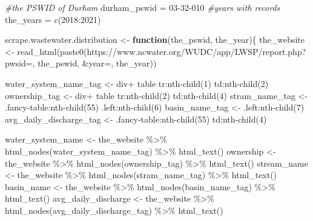 \documentclass[
  12pt,
]{article}
\newenvironment{Shaded}{\begin{snugshade}}{\end{snugshade}}
\newcommand{\CommentTok}[1]{\textcolor[rgb]{0.56,0.35,0.01}{\textit{#1}}}
\newcommand{\ControlFlowTok}[1]{\textcolor[rgb]{0.13,0.29,0.53}{\textbf{#1}}}
\newcommand{\DecValTok}[1]{\textcolor[rgb]{0.00,0.00,0.81}{#1}}
\newcommand{\FunctionTok}[1]{\textcolor[rgb]{0.00,0.00,0.00}{#1}}
\newcommand{\NormalTok}[1]{#1}
\newcommand{\OtherTok}[1]{\textcolor[rgb]{0.56,0.35,0.01}{#1}}
\newcommand{\SpecialCharTok}[1]{\textcolor[rgb]{0.00,0.00,0.00}{#1}}
\newcommand{\StringTok}[1]{\textcolor[rgb]{0.31,0.60,0.02}{#1}}
\begin{document}
\begin{Shaded}
\begin{Highlighting}[]
\CommentTok{\#the PSWID of Durham}
\NormalTok{durham\_pswid }\OtherTok{=} \StringTok{\textquotesingle{}03{-}32{-}010\textquotesingle{}}
\CommentTok{\#years with records}
\NormalTok{the\_years }\OtherTok{=} \FunctionTok{c}\NormalTok{(}\DecValTok{2018}\SpecialCharTok{:}\DecValTok{2021}\NormalTok{)}

\NormalTok{scrape.wastewater.distribution }\OtherTok{\textless{}{-}} \ControlFlowTok{function}\NormalTok{(the\_pswid, the\_year)\{}
\NormalTok{  the\_website }\OtherTok{\textless{}{-}} \FunctionTok{read\_html}\NormalTok{(}\FunctionTok{paste0}\NormalTok{(}\StringTok{\textquotesingle{}https://www.ncwater.org/WUDC/app/LWSP/report.php?pwsid=\textquotesingle{}}\NormalTok{, }
\NormalTok{                                  the\_pswid, }\StringTok{\textquotesingle{}\&year=\textquotesingle{}}\NormalTok{, the\_year))}
  
\NormalTok{  water\_system\_name\_tag }\OtherTok{\textless{}{-}} \StringTok{\textquotesingle{}div+ table tr:nth{-}child(1) td:nth{-}child(2)\textquotesingle{}}
\NormalTok{  ownership\_tag }\OtherTok{\textless{}{-}} \StringTok{\textquotesingle{}div+ table tr:nth{-}child(2) td:nth{-}child(4)\textquotesingle{}}
\NormalTok{  stram\_name\_tag }\OtherTok{\textless{}{-}} \StringTok{\textquotesingle{}.fancy{-}table:nth{-}child(55) .left:nth{-}child(6)\textquotesingle{}}
\NormalTok{  basin\_name\_tag }\OtherTok{\textless{}{-}} \StringTok{\textquotesingle{}.left:nth{-}child(7)\textquotesingle{}}
\NormalTok{  avg\_daily\_discharge\_tag }\OtherTok{\textless{}{-}} \StringTok{\textquotesingle{}.fancy{-}table:nth{-}child(55) td:nth{-}child(4)\textquotesingle{}}

\NormalTok{  water\_system\_name }\OtherTok{\textless{}{-}}\NormalTok{ the\_website }\SpecialCharTok{\%\textgreater{}\%} \FunctionTok{html\_nodes}\NormalTok{(water\_system\_name\_tag) }\SpecialCharTok{\%\textgreater{}\%} \FunctionTok{html\_text}\NormalTok{()}
\NormalTok{  ownership }\OtherTok{\textless{}{-}}\NormalTok{ the\_website }\SpecialCharTok{\%\textgreater{}\%}   \FunctionTok{html\_nodes}\NormalTok{(ownership\_tag) }\SpecialCharTok{\%\textgreater{}\%}  \FunctionTok{html\_text}\NormalTok{()}
\NormalTok{  stream\_name }\OtherTok{\textless{}{-}}\NormalTok{ the\_website }\SpecialCharTok{\%\textgreater{}\%} \FunctionTok{html\_nodes}\NormalTok{(stram\_name\_tag) }\SpecialCharTok{\%\textgreater{}\%} \FunctionTok{html\_text}\NormalTok{()}
\NormalTok{  basin\_name }\OtherTok{\textless{}{-}}\NormalTok{ the\_website }\SpecialCharTok{\%\textgreater{}\%} \FunctionTok{html\_nodes}\NormalTok{(basin\_name\_tag) }\SpecialCharTok{\%\textgreater{}\%} \FunctionTok{html\_text}\NormalTok{()}
\NormalTok{  avg\_daily\_discharge }\OtherTok{\textless{}{-}}\NormalTok{ the\_website }\SpecialCharTok{\%\textgreater{}\%} \FunctionTok{html\_nodes}\NormalTok{(avg\_daily\_discharge\_tag) }\SpecialCharTok{\%\textgreater{}\%} \FunctionTok{html\_text}\NormalTok{()}


\end{Highlighting}
\end{Shaded}
\end{document}
